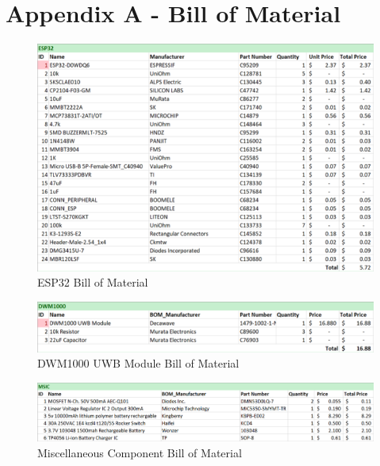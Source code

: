 
\setcounter{section}{4}
\section{Appendix A - Bill of Material}

\begin{figure}[H]
\centering
    \includegraphics[width=\linewidth]{./images/esp32.png}
    \caption{ESP32 Bill of Material}
\end{figure}

\medskip
\begin{figure}[H]
\centering
    \includegraphics[width=\linewidth]{./images/dwm1000.png}
    \caption{DWM1000 UWB Module Bill of Material}
\end{figure}


\medskip
\begin{figure}[H]
\centering
    \includegraphics[width=\linewidth]{./images/msic.png}
    \caption{Miscellaneous Component  Bill of Material}
\end{figure}



